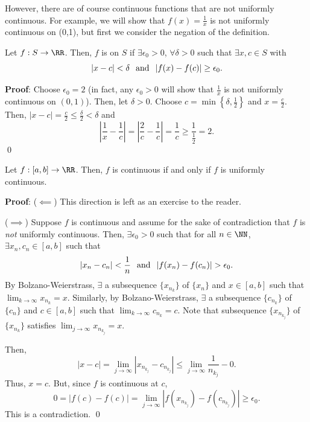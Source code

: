 However, there are of course continuous functions that are not uniformly continuous. For example, we will show that $f(x) = \frac{1}{x}$ is not uniformly continuous on (0,1), but first we consider the negation of the definition.
\begin{negation}
Let $f:S\to \RR$. Then, $f$ is  on $S$ if $\exists \epsilon_0 >0$, $\forall \delta >0$ such that $\exists x,c\in S$ with
\[
|x-c|< \delta \hspace{.25cm} \text{and} \hspace{.25cm} |f(x) - f(c)|\geq \epsilon_0.
\]
\end{negation}
\textbf{Proof}: Choose $\epsilon_0 = 2$ (in fact, any $\epsilon_0 >0$ will show that $\frac{1}{x}$ is not uniformly continuous on $(0,1)$). Then, let $\delta >0$. Choose $c = \min\left\{\delta, \frac{1}{2}\right\}$ and $x = \frac{c}{2}$. Then, $|x-c| = \frac{c}{2}\leq \frac{\delta}{2} <\delta$ and 
\[
\left|\frac{1}{x} - \frac{1}{c}\right| = \left|\frac{2}{c} - \frac{1}{c}\right| = \frac{1}{c} \geq \frac{1}{\frac{1}{2}} = 2.
\] \qed 

\begin{theorem}
Let $f:[a,b]\to \RR$. Then, $f$ is continuous if and only if $f$ is uniformly continuous.
\end{theorem}
\textbf{Proof}: ($\impliedby$) This direction is left as an exercise to the reader.

($\implies$) Suppose $f$ is continuous and assume for the sake of contradiction that $f$ is \textit{not} uniformly continuous. Then, $\exists \epsilon_0>0$ such that for all $n\in \NN$, $\exists x_n,c_n\in [a,b]$ such that 
\[
|x_n-c_n| < \frac{1}{n} \hspace{.25cm} \text{and} \hspace{.25cm} |f(x_n) - f(c_n)| >\epsilon_0.
\]
By Bolzano-Weierstrass, $\exists$ a subsequence $\{x_{n_k}\}$ of $\{x_n\}$ and $x\in [a,b]$ such that $\lim_{k\to \infty} x_{n_k} = x$. Similarly, by Bolzano-Weierstrass, $\exists$ a subsequence $\{c_{n_k}\}$ of $\{c_n\}$ and $c\in [a,b]$ such that $\lim_{k\to \infty} c_{n_k} = c$. Note that subsequence $\{x_{n_{k_j}}\}$ of $\{x_{n_k}\}$ satisfies $\lim_{j\to \infty} x_{n_{k_j}} = x$.

Then, 
\[
|x-c| = \lim_{j\to \infty} |x_{n_{k_j}} - c_{n_{k_j}}| \leq \lim_{j\to \infty} \frac{1}{n_{k_j}} - 0.
\]
Thus, $x=c$. But, since $f$ is continuous at $c$,
\[
0 = |f(c)-f(c)| = \lim_{j\to \infty} |f(x_{n_{k_j}}) - f(c_{n_{k_j}})| \geq \epsilon_0.
\]
This is a contradiction. \qed 

